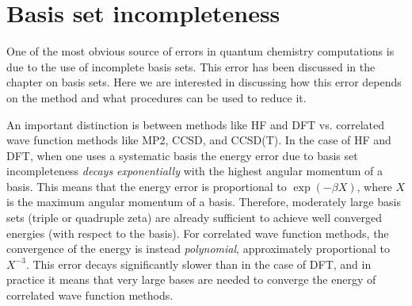 \documentclass[../Main/chem371-notes.tex]{subfiles}
\begin{document}
\section{Basis set incompleteness}
One of the most obvious source of errors in quantum chemistry computations is due to the use of incomplete basis sets.
This error has been discussed in the chapter on basis sets.
Here we are interested in discussing how this error depends on the method and what procedures can be used to reduce it.

An important distinction is between methods like HF and DFT vs. correlated wave function methods like MP2, CCSD, and CCSD(T).
In the case of HF and DFT, when one uses a systematic basis the energy error due to basis set incompleteness \emph{decays exponentially} with the highest angular momentum of a basis.
This means that the energy error is proportional to $\exp(-\beta X)$, where $X$ is the maximum angular momentum of a basis.
Therefore, moderately large basis sets (triple or quadruple zeta) are already sufficient to achieve well converged energies (with respect to the basis).
For correlated wave function methods, the convergence of the energy is instead \emph{polynomial}, approximately proportional to $X^{-3}$.
This error decays significantly slower than in the case of DFT, and in practice it means that very large bases are needed to converge the energy of correlated wave function methods.

\end{document}
